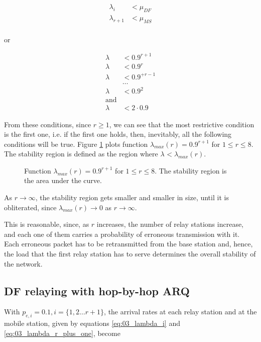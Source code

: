 \begin{align*}
  \lambda_i &< \mu_{DF} \\
  \lambda_{r+1} &< \mu_{MS} \\
\end{align*}

or

\begin{align*}
  \lambda &< 0.9^{r+1} \\
  \lambda &< 0.9^{r} \\
  \lambda &< 0.9^{+r-1} \\
  & \dots \\
  \lambda &< 0.9^2 \\
  \text{and}\\
  \lambda &< 2 \cdot 0.9
\end{align*}

From these conditions, since $r \geq 1$, we can see that the most
restrictive condition is the first one, i.e. if the first one holds, then,
inevitably, all the following conditions will be true. Figure
\ref{fig:04_stability_region_df_e2e} plots function
$\lambda_{max}(r) = 0.9^{r+1}$ for $1 \leq r \leq 8$. The stability
region is defined as the region where $\lambda_{} < \lambda_{max}(r)$.

\begin{figure}\centering
  
  \caption{Function $\lambda_{max}(r) = 0.9^{r+1}$ for $1 \leq r \leq 8$.
    The stability region is the area under the curve.}
  \label{fig:04_stability_region_df_e2e}
\end{figure}

As $r \to \infty$, the stability region gets smaller and smaller in size, until
it is obliterated, since $\lambda_{max}(r) \to 0$ as $r \to \infty$.

This is reasonable, since, as $r$ increases, the number of relay stations
increase, and each one of them carries a probability of erroneous transmission
with it. Each erroneous packet has to be retransmitted from the base station
and, hence, the load that the first relay station has to serve determines the
overall stability of the network.


\subsection{DF relaying with hop-by-hop ARQ}

With $p_{e,i} = 0.1, i = \{1,2 \dots r+1\}$, the arrival rates at each relay
station and at the mobile station, given by equations \ref{eq:03_lambda_i}
and \ref{eq:03_lambda_r_plus_one}, become


